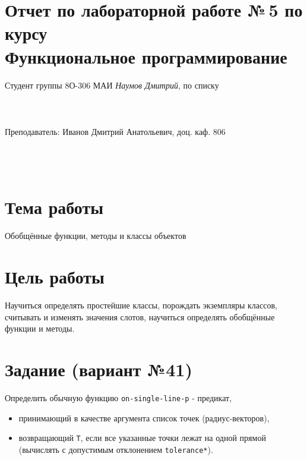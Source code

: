 \documentclass[12pt]{article}
\begin{document}
\section*{Отчет по лабораторной работе №\,5 по курсу \\
\guillemotleft Функциональное программирование\guillemotright}
\begin{flushright}
Студент группы 8О-306 МАИ \textit{Наумов Дмитрий},  по списку \\
 \\
 \\
\ \\
Преподаватель: Иванов Дмитрий Анатольевич, доц. каф. 806 \\
 \\
 \\
 \\

\end{flushright}

\section{Тема работы}
Обобщённые функции, методы и классы объектов

\section{Цель работы}
Научиться определять простейшие классы, порождать экземпляры классов, считывать и изменять значения слотов, научиться определять обобщённые функции и методы.

\section{Задание (вариант №41)}
Определить обычную функцию {\tt on-single-line-p} - предикат,

\begin{itemize}
  \item принимающий в качестве аргумента список точек (радиус-векторов),
  \item возвращающий {\tt T}, если все указанные точки лежат на одной прямой (вычислять с допустимым отклонением {\tt *tolerance*}).
\end{itemize}
\end{document}
